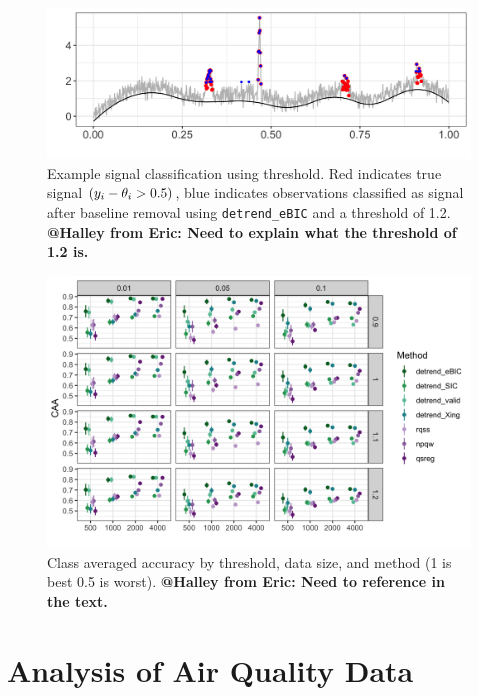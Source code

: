 \documentclass[aoas]{imsart}
\makeatletter
\newcommand{\Halley}[2]{{\bf {\color{purple}@Halley from #1: #2}}\xspace}
\newcommand{\VE}[2]{\MakeLowercase{#1}_{#2}} %
\makeatother
\begin{document}
\begin{figure}[h!]
	\includegraphics[width = \linewidth]{Figures/peaks_eg_class.png}
	\caption{Example signal classification using threshold. Red indicates true signal $(\VE{y}{i} - \VE{\theta}{i} > 0.5)$, blue indicates observations classified as signal after baseline removal using \texttt{detrend\_eBIC} and a threshold of 1.2. \Halley{Eric}{Need to explain what the threshold of 1.2 is.}}
	\label{fig:peaks_class_eg}
\end{figure}


\begin{figure}[h!]
	\includegraphics[width = \linewidth]{Figures/peaks_CAA.png}
	\caption{Class averaged accuracy by threshold, data size, and method (1 is best 0.5 is worst). \Halley{Eric}{Need to reference in the text.}}
\end{figure}


\FloatBarrier

\section{Analysis of Air Quality Data}
\end{document}
